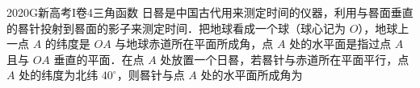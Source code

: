 
\begin{problem}{2020}{G}{新高考I卷}{4}{三角函数}
日晷是中国古代用来测定时间的仪器，利用与晷面垂直的晷针投射到晷面的影子来测定时间．把地球看成一个球（球心记为 $ O $），地球上一点 $ A $ 的纬度是 $ OA $ 与地球赤道所在平面所成角，点 $ A $ 处的水平面是指过点 $ A $ 且与 $ OA $ 垂直的平面．在点 $ A $ 处放置一个日晷，若晷针与赤道所在平面平行，点 $ A $ 处的纬度为北纬 $ 40^\circ $，则晷针与点 $ A $ 处的水平面所成角为
\begin{choices}
\end{choices}
\end{problem}

\begin{answer}

\end{answer}

\begin{solutions}

\end{solutions}